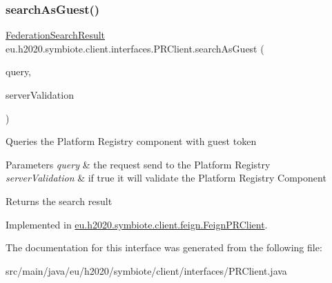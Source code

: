 \subsubsection{\texorpdfstring{search\+As\+Guest()}{searchAsGuest()}}
{\footnotesize\ttfamily \hyperlink{classeu_1_1h2020_1_1symbiote_1_1cloud_1_1model_1_1internal_1_1FederationSearchResult}{Federation\+Search\+Result} eu.\+h2020.\+symbiote.\+client.\+interfaces.\+P\+R\+Client.\+search\+As\+Guest (\begin{DoxyParamCaption}\item[{\hyperlink{classeu_1_1h2020_1_1symbiote_1_1cloud_1_1model_1_1internal_1_1PlatformRegistryQuery}{Platform\+Registry\+Query}}]{query,  }\item[{boolean}]{server\+Validation }\end{DoxyParamCaption})}

Queries the Platform Registry component with guest token


\begin{DoxyParams}{Parameters}
{\em query} & the request send to the Platform Registry \\
\hline
{\em server\+Validation} & if true it will validate the Platform Registry Component \\
\hline
\end{DoxyParams}
\begin{DoxyReturn}{Returns}
the search result 
\end{DoxyReturn}


Implemented in \hyperlink{classeu_1_1h2020_1_1symbiote_1_1client_1_1feign_1_1FeignPRClient_af8496815060c4340e3aa3517d6fa2456}{eu.\+h2020.\+symbiote.\+client.\+feign.\+Feign\+P\+R\+Client}.



The documentation for this interface was generated from the following file\+:\begin{DoxyCompactItemize}
\item 
src/main/java/eu/h2020/symbiote/client/interfaces/P\+R\+Client.\+java\end{DoxyCompactItemize}
